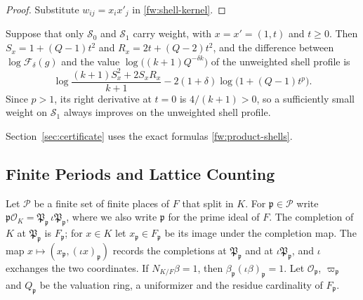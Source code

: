 \begin{proof}
Substitute $w_{ij}=x_ix'_j$ in \eqref{fw:shell-kernel}.
\end{proof}

\begin{remark}\label{fw:one-shell}
Suppose that only $\mathcal S_0$ and $\mathcal S_1$ carry weight, with
$x=x'=(1,t)$ and $t\ge0$. Then $S_x=1+(Q-1)t^2$ and
$R_x=2t+(Q-2)t^2$, and the difference between $\log\mathcal F_\delta(g)$
and the value $\log\bigl((k+1)Q^{-\delta k}\bigr)$ of the unweighted
shell profile is
\begin{equation}\label{fw:one-shell-gain}
 \log\frac{(k+1)S_x^2+2S_xR_x}{k+1}-2(1+\delta)\log\bigl(1+(Q-1)t^p\bigr).
\end{equation}
Since $p>1$, its right derivative at $t=0$ is $4/(k+1)>0$, so a
sufficiently small weight on $\mathcal S_1$ always improves on the
unweighted shell profile.
\end{remark}

Section~\ref{sec:certificate} uses the exact formulas
\eqref{fw:product-shells}.

\subsection{Finite Periods and Lattice Counting}

Let $\mathcal P$ be a finite set of finite places of $F$ that split in
$K$. For $\mathfrak p\in\mathcal P$ write $\mathfrak p\mathcal
O_K=\mathfrak P_{\mathfrak p}\,\iota\mathfrak P_{\mathfrak p}$, where we
also write $\mathfrak p$ for the prime ideal of $F$. The completion of
$K$ at $\mathfrak P_{\mathfrak p}$ is $F_{\mathfrak p}$; for $x\in K$ let
$x_{\mathfrak p}\in F_{\mathfrak p}$ be its image under the completion
map. The map $x\mapsto(x_{\mathfrak p},(\iota x)_{\mathfrak p})$ records
the completions at $\mathfrak P_{\mathfrak p}$ and at $\iota\mathfrak
P_{\mathfrak p}$, and $\iota$ exchanges the two coordinates. If
$N_{K/F}\beta=1$, then $\beta_{\mathfrak p}(\iota\beta)_{\mathfrak p}=1$.
Let $\mathcal O_{\mathfrak p}$, $\varpi_{\mathfrak p}$ and $Q_{\mathfrak
p}$ be the valuation ring, a uniformizer and the residue cardinality of
$F_{\mathfrak p}$.

